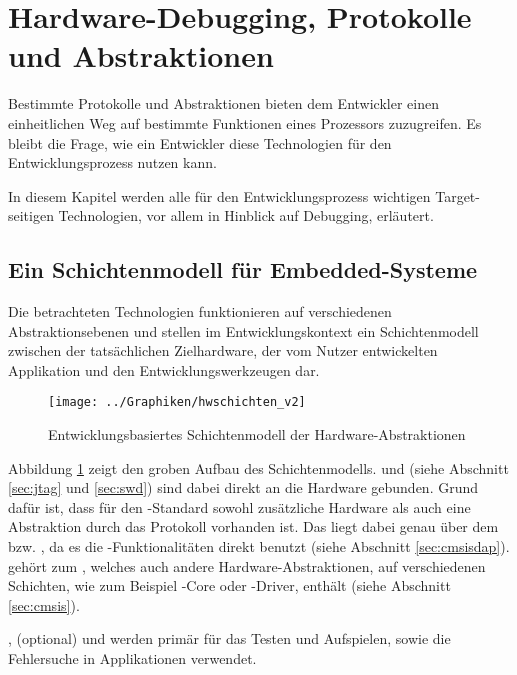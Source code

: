\section{Hardware-Debugging, Protokolle und Abstraktionen}
\label{sec:protocols}
Bestimmte Protokolle und Abstraktionen bieten dem Entwickler einen einheitlichen Weg auf bestimmte Funktionen eines
Prozessors zuzugreifen. Es bleibt die Frage, wie ein Entwickler diese Technologien für den Entwicklungsprozess nutzen
kann.

In diesem Kapitel werden alle für den Entwicklungsprozess wichtigen Target-seitigen Technologien, vor allem in Hinblick
auf Debugging, erläutert.

    \subsection{Ein Schichtenmodell für Embedded-Systeme}
    \label{sec:layers}
    Die betrachteten Technologien funktionieren auf verschiedenen Abstraktionsebenen und stellen im Entwicklungskontext
    ein Schichtenmodell zwischen der tatsächlichen Zielhardware, der vom Nutzer entwickelten Applikation und den
    Entwicklungswerkzeugen dar.

    \begin{figure}[h]
        \centering
        \caption{Entwicklungsbasiertes Schichtenmodell der Hardware-Abstraktionen}
        \label{fig:layerhwab}
        \texttt{[image: ../Graphiken/hwschichten\_v2]}
    \end{figure}

    Abbildung \ref{fig:layerhwab} zeigt den groben Aufbau des Schichtenmodells.  und  (siehe Abschnitt
    \ref{sec:jtag} und \ref {sec:swd}) sind dabei direkt an die Hardware gebunden. Grund dafür ist, dass für den
    -Standard sowohl zusätzliche Hardware als auch eine Abstraktion durch das Protokoll vorhanden ist. Das 
    liegt dabei genau über dem  bzw. , da es die -Funktionalitäten direkt benutzt
    (siehe Abschnitt \ref{sec:cmsisdap}).  gehört zum , welches auch andere Hardware-Abstraktionen,
    auf verschiedenen Schichten, wie zum Beispiel -Core oder -Driver, enthält (siehe Abschnitt
    \ref{sec:cmsis}).

    ,  (optional) und  werden primär für das Testen und Aufspielen, sowie die Fehlersuche in
    Applikationen verwendet.

